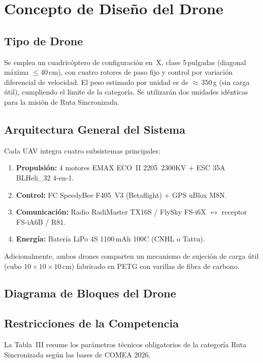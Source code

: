 \documentclass[10pt, twocolumn, letterpaper]{article}
\begin{document}
\section{Concepto de Diseño del Drone}
\subsection{Tipo de Drone}
Se emplea un cuadricóptero de configuración en~X, clase 5\,pulgadas (diagonal
máxima $\leq 40$\,cm), con cuatro rotores de paso fijo y control por variación
diferencial de velocidad. El peso estimado por unidad es de $\approx$\,350\,g
(sin carga útil), cumpliendo el límite de la categoría. Se utilizarán dos
unidades idénticas para la misión de Ruta Sincronizada.

\subsection{Arquitectura General del Sistema}
Cada UAV integra cuatro subsistemas principales:
\begin{enumerate}[leftmargin=*, itemsep=0pt, topsep=2pt]
\item \textbf{Propulsión:} 4 motores EMAX ECO~II 2205~2300KV + ESC 35A BLHeli\_32 4-en-1.
\item \textbf{Control:} FC SpeedyBee F405~V3 (Betaflight) + GPS uBlox M8N.
\item \textbf{Comunicación:} Radio RadiMaster TX16S / FlySky FS-i6X $\leftrightarrow$ receptor FS-iA6B / R81.
\item \textbf{Energía:} Batería LiPo 4S 1100\,mAh 100C (CNHL o Tattu).
\end{enumerate}
Adicionalmente, ambos drones comparten un mecanismo de sujeción de carga útil
(cubo $10\times10\times10$\,cm) fabricado en PETG con varillas de fibra de carbono.

\subsection{Diagrama de Bloques del Drone}
\noindent{}

\subsection{Restricciones de la Competencia}
La Tabla~III resume los parámetros técnicos obligatorios de la categoría Ruta
Sincronizada según las bases de COMEA 2026.
\end{document}
